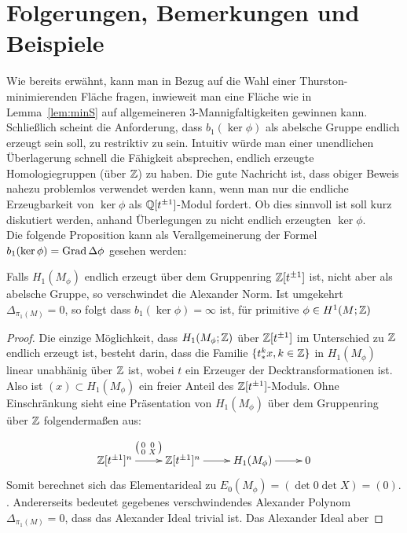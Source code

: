 
\section{Folgerungen, Bemerkungen und Beispiele}
    
    Wie bereits erwähnt, kann man in Bezug auf die Wahl einer Thurston-minimierenden Fläche fragen, inwieweit man eine Fläche wie in Lemma~\ref{lem:minS} auf allgemeineren 3-Mannigfaltigkeiten gewinnen kann. Schließlich scheint die Anforderung, dass $b_1(\ker\phi)$ als abelsche Gruppe endlich erzeugt sein soll, zu restriktiv zu sein. Intuitiv würde man einer unendlichen Überlagerung schnell die Fähigkeit absprechen, endlich erzeugte Homologiegruppen (über $\mathbb{Z}$) zu haben. Die gute Nachricht ist, dass obiger Beweis nahezu problemlos verwendet werden kann, wenn man nur die endliche Erzeugbarkeit von $\ker\phi$ als $\mathbb{Q}[t^{\pm 1}]$-Modul fordert. Ob dies sinnvoll ist soll kurz diskutiert werden, anhand Überlegungen zu nicht endlich erzeugten $\ker\phi$.\\
    Die folgende Proposition kann als Verallgemeinerung der Formel $b_1(\ker\phi)=\operatorname{Grad}\Delta\phi$ gesehen werden:
    \begin{prop}
    	Falls $H_1(M_\phi)$ endlich erzeugt über dem Gruppenring $\mathbb{Z}[t^{\pm 1}]$ ist, nicht aber als abelsche Gruppe, so verschwindet die Alexander Norm. Ist umgekehrt $\Delta_{\pi_1(M)}=0$, so folgt dass $b_1(\ker\phi)=\infty$ ist, für primitive $\phi\in H^1(M;\mathbb{Z})$
    \end{prop}
    \begin{proof}
    	Die einzige Möglichkeit, dass $H_1(M_\phi;\mathbb{Z})$ über $\mathbb{Z}[t^{\pm 1}]$ im Unterschied zu $\mathbb{Z}$ endlich erzeugt ist, besteht darin, dass die Familie $\{t_*^kx,k\in\mathbb{Z}\}$ in $H_1(M_\phi)$ linear unabhänig über $\mathbb{Z}$ ist, wobei $t$ ein Erzeuger der Decktransformationen ist. Also ist $(x)\subset H_1(M_\phi)$ ein freier Anteil des $\mathbb{Z}[t^{\pm 1}]$-Moduls. Ohne Einschränkung sieht eine Präsentation von $H_1(M_\phi)$ über dem Gruppenring über $\mathbb{Z}$ folgendermaßen aus:
    	\[
    		\begin{xy}
    			\xymatrix@L+3pt{\laurent \ZZ t ^n \ar[r]^{\bigl(\begin{smallmatrix}0&0\\0&X\end{smallmatrix}\bigr)} & \laurent \ZZ t ^n \ar[r] &H_1(M_\phi) \ar[r] &0}
    		\end{xy}
    	\]
    	Somit berechnet sich das Elementarideal zu $E_0(M_\phi)=(\det 0\det X)=(0)$.\\ .
    	Andererseits bedeutet gegebenes verschwindendes Alexander Polynom $\Delta_{\pi_1(M)}=0$, dass das Alexander Ideal trivial ist. Das Alexander Ideal aber 
    \end{proof}

